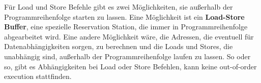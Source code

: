 \documentclass[a4paper,12pt,headsepline]{scrartcl}
\begin{document}
Für Load und Store Befehle gibt es zwei Möglichkeiten, sie außerhalb der Programmreihenfolge starten zu lassen. Eine Möglichkeit ist ein \textbf{Load-Store Buffer}, eine spezielle Reservation Station, die immer in Programmreihenfolge abgearbeitet wird. Eine andere Möglichkeit wäre, die Adressen, die eventuell für Datenabhängigkeiten sorgen, zu berechnen und die Loads und Stores, die unabhängig sind, außerhalb der Programmreihenfolge laufen zu lassen. So oder so, gibt es Abhängigkeiten bei Load oder Store Befehlen, kann keine out-of-order execution stattfinden.
\end{document}
